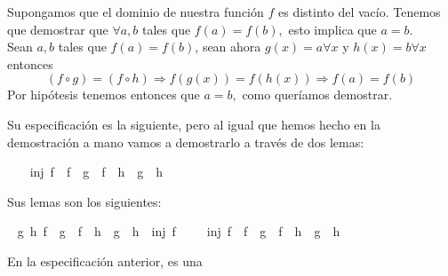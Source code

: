 \begin{isabellebody}
\begin{isamarkuptext}
\begin {demostracion}
Supongamos que el dominio de nuestra función $f$ es distinto del vacío.
Tenemos que demostrar que $\forall a,b$ tales que $f(a) = f(b),$ esto
 implica que $a = b.$ \\
Sean $a,b$ tales que $f(a) = f(b)$, sean ahora $g(x) = a \forall x$ y
 $h(x) = b \forall x$ entonces 
$$(f \circ g) = (f \circ h) \Longrightarrow  f(g(x)) = f(h(x)) \Longrightarrow f(a) = f(b)$$
Por hipótesis tenemos entonces que $a = b,$ como queríamos demostrar.
\end {demostracion}


  Su especificación es la siguiente, pero al igual que hemos hecho en la demostración
a mano vamos a demostrarlo a través de dos lemas:%
\end{isamarkuptext}\isamarkuptrue%
\isamarkupfalse%
\ \isanewline
\ \ {\isachardoublequoteopen}inj\ f\ {\isasymlongleftrightarrow}\ {\isacharparenleft}f\ {\isasymcirc}\ g\ {\isacharequal}\ f\ {\isasymcirc}\ h{\isacharparenright}\ {\isacharequal}\ {\isacharparenleft}g\ {\isacharequal}\ h{\isacharparenright}{\isachardoublequoteclose}\isanewline
%
\isadelimproof
\ \ %
\endisadelimproof
%
\isatagproof
{}\isamarkupfalse%
%
\endisatagproof
{\isafoldproof}%
%
\isadelimproof
%
\endisadelimproof
%
\begin{isamarkuptext}%
Sus lemas son los siguientes:%
\end{isamarkuptext}\isamarkuptrue%
\isamarkupfalse%
\ \isanewline
{\isachardoublequoteopen}{\isasymforall}g\ h{\isachardot}\ {\isacharparenleft}f\ {\isasymcirc}\ g\ {\isacharequal}\ f\ {\isasymcirc}\ h\ {\isasymlongrightarrow}\ g\ {\isacharequal}\ h{\isacharparenright}\ {\isasymLongrightarrow}\ inj\ f{\isachardoublequoteclose}\isanewline
%
\isadelimproof
\ \ %
\endisadelimproof
%
\isatagproof
{}\isamarkupfalse%
%
\endisatagproof
{\isafoldproof}%
%
\isadelimproof
\isanewline
%
\endisadelimproof
\isanewline
{}\isamarkupfalse%
\ \isanewline
{\isachardoublequoteopen}inj\ f\ {\isasymLongrightarrow}\ {\isacharparenleft}f\ {\isasymcirc}\ g\ {\isacharequal}\ f\ {\isasymcirc}\ h{\isacharparenright}\ {\isacharequal}\ {\isacharparenleft}g\ {\isacharequal}\ h{\isacharparenright}{\isachardoublequoteclose}\isanewline
%
\isadelimproof
\ \ %
\endisadelimproof
%
\isatagproof
{}\isamarkupfalse%
%
\endisatagproof
{\isafoldproof}%
%
\isadelimproof
%
\endisadelimproof
%
\begin{isamarkuptext}%
En la especificación anterior,  es una 

\end{isamarkuptext}
\end{isabellebody}
